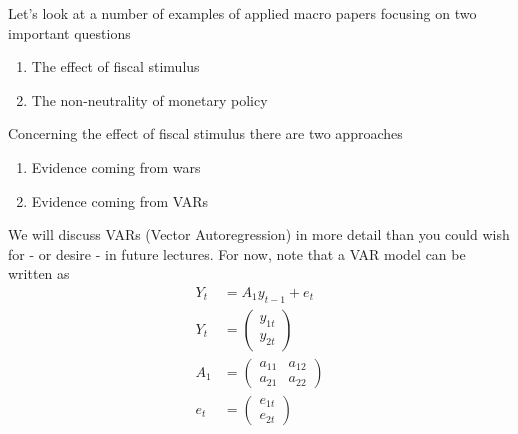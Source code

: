 \documentclass{beamer}
\begin{document}
\begin{frame}
  Let's look at a number of examples of applied macro papers focusing on two important questions
  \medskip
  \begin{enumerate}
    \item The effect of fiscal stimulus
    \item The non-neutrality of monetary policy
  \end{enumerate}
\end{frame}

\begin{frame}
  Concerning the effect of fiscal stimulus there are two approaches  
  \medskip  
  \begin{enumerate}
    \item Evidence coming from wars
    \item Evidence coming from VARs
  \end{enumerate}  
\end{frame}

\begin{frame}
 We will discuss VARs (Vector Autoregression) in more detail than you could wish for - or desire - in future lectures. 
 For now, note that a VAR model can be written as
 \medskip 
 \begin{align}
   Y_t &= A_1 y_{t-1} + e_t\\
   Y_t &= \begin{pmatrix} y_{1t} \\ y_{2t} \end{pmatrix}\\
   A_1 &= \begin{pmatrix} a_{11} & a_{12} \\ a_{21} & a_{22} \end{pmatrix}\\
   e_t &= \begin{pmatrix} e_{1t} \\ e_{2t} \end{pmatrix}
 \end{align}
\end{frame}
\end{document}
